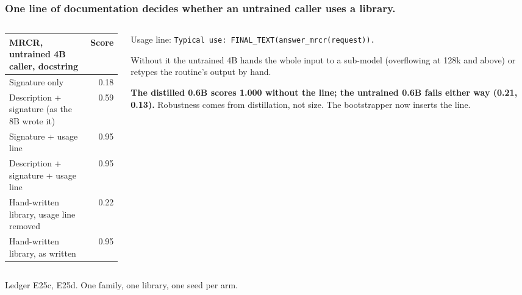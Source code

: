 \documentclass[aspectratio=169,11pt]{beamer}
\newcommand{\source}[1]{\vfill{\scriptsize\color{Gray}#1\par}}
\begin{document}
\begin{frame}[t]
\frametitle{One line of documentation decides whether an untrained caller uses a library.}
\begin{columns}[T,onlytextwidth]
\begin{column}{.5\textwidth}
\footnotesize
\begin{tabular}{@{}lr@{}}
\toprule
MRCR, untrained 4B caller, docstring & Score \\
\midrule
Signature only & 0.18 \\
Description + signature (as the 8B wrote it) & 0.59 \\
Signature + usage line & 0.95 \\
Description + signature + usage line & 0.95 \\
\midrule
Hand-written library, usage line removed & 0.22 \\
Hand-written library, as written & 0.95 \\
\bottomrule
\end{tabular}
\end{column}
\begin{column}{.46\textwidth}
\small
Usage line: \texttt{Typical use: FINAL\_TEXT(answer\_mrcr(request)).}\par\medskip
Without it the untrained 4B hands the whole input to a sub-model (overflowing at 128k and above) or retypes the
routine's output by hand.\par\medskip
\textbf{The distilled 0.6B scores 1.000 without the line; the untrained 0.6B fails either way (0.21, 0.13).}
Robustness comes from distillation, not size. The bootstrapper now inserts the line.
\end{column}
\end{columns}
\source{Ledger E25c, E25d. One family, one library, one seed per arm.}
\end{frame}
\end{document}
